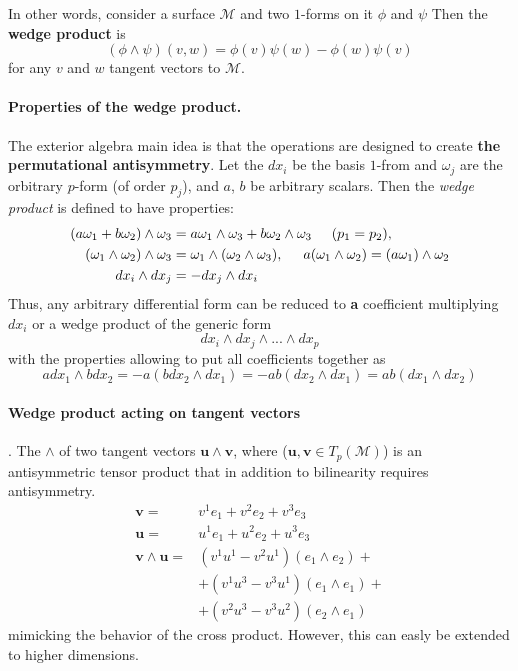 In other words, consider a surface $\mathcal{M}$ and two $1$-forms on it $\phi$ and $\psi$ Then the \textbf{wedge product} is 
\begin{equation}
(\phi\wedge\psi)(v,w)=\phi(v)\psi(w) - \phi(w)\psi(v)
\end{equation}
for any $v$ and $w$ tangent vectors to $\mathcal{M}$.

\paragraph{Properties of the wedge product.} The exterior algebra main idea is that the operations are designed to create \textbf{the permutational antisymmetry}. 
Let the $dx_i$ be the basis $1$-from and $\omega_j$ are the orbitrary $p$-form (of order $p_j$), and $a$, $b$ be arbitrary scalars. 
Then the \textit{wedge product} is defined to have properties:
\begin{align}
(a\omega_1+b\omega_2)\wedge\omega_3 &= a\omega_1\wedge\omega_3+b\omega_2\wedge\omega_3 \hspace{5mm} (p_1 = p_2), \\
(\omega_1\wedge\omega_2)\wedge\omega_3 &= \omega_1\wedge(\omega_2\wedge\omega_3), \hspace{5mm} a(\omega_1\wedge\omega_2) =  (a\omega_1)\wedge\omega_2\\
dx_i\wedge dx_j &= -dx_j\wedge dx_i
\end{align}
Thus, any arbitrary differential form can be reduced to \textbf{a} coefficient multiplying $dx_i$ or a wedge product of the generic form 
\begin{equation}
dx_i\wedge dx_j \wedge...\wedge dx_p
\end{equation}
with the properties allowing to put all coefficients together as 
\begin{equation}
a dx_1 \wedge b dx_2 = - a(b dx_2 \wedge dx_1) = -ab(dx_2 \wedge dx_1) = ab(dx_1 \wedge dx_2)
\end{equation}

\paragraph{Wedge product acting on tangent vectors}.
The $\wedge$ of two tangent vectors $\boldsymbol{u}\wedge\boldsymbol{v}$, where ($\boldsymbol{u}, \boldsymbol{v}\in T_p(\mathcal{M})$) is an antisymmetric tensor product that in addition to bilinearity requires antisymmetry. 
\begin{align}
\boldsymbol{v} =& v^1e_1 + v^2 e_2 + v^3 e_3 \\
\boldsymbol{u} =& u^1e_1 + u^2 e_2 + u^3 e_3 \\
\boldsymbol{v}\wedge\boldsymbol{u} =& (v^1u^1 - v^2u^1)(e_1\wedge e_2) + \\
& + (v^1u^3 - v^3u^1)(e_1\wedge e_1) + \\
& + (v^2u^3 - v^3u^2)(e_2\wedge e_1)
\end{align}
mimicking the behavior of the cross product. 
However, this can easly be extended to higher dimensions. 

